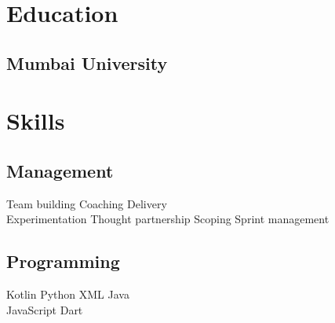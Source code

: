 \documentclass[]{deedy-resume-reversed}
\begin{document}
\begin{minipage}[t]{0.60\textwidth}

% 
% 

%
%

\end{minipage}
\hfill
\begin{minipage}[t]{0.33\textwidth}


\section{Education}

\subsection{Mumbai University}
\sectionsep


\section{Skills}

\subsection{Management}
Team building \textbullet{} Coaching \textbullet{} Delivery \\\textbullet{}
Experimentation \textbullet{} Thought partnership \textbullet{} Scoping \textbullet{} Sprint management 
\sectionsep

\subsection{Programming}
Kotlin \textbullet{} Python \textbullet{} XML \textbullet{}
Java \\\textbullet{} JavaScript \textbullet{} Dart
\sectionsep


\end{minipage}
\end{document}
